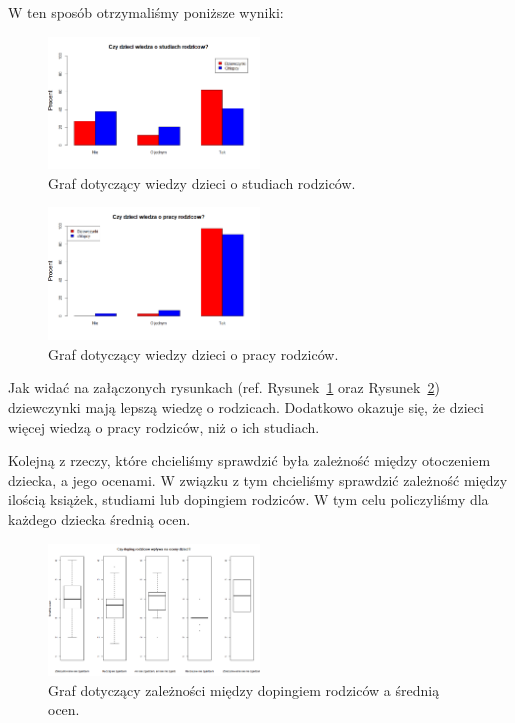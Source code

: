 \documentclass[conference]{IEEEtran}
\begin{document}
W ten sposób otrzymaliśmy poniższe wyniki:

\begin{figure}
	\centering
	\includegraphics[width=0.5\textwidth]{1.png}
	\caption{Graf dotyczący wiedzy dzieci o studiach rodziców.}
	\label{fig:studies_knowledge}
\end{figure}
\begin{figure}
	\centering
	\includegraphics[width=0.5\textwidth]{2.png}
	\caption{Graf dotyczący wiedzy dzieci o pracy rodziców.}
	\label{fig:work_knowledge}
\end{figure}

Jak widać na załączonych rysunkach (ref. Rysunek~\ref{fig:studies_knowledge} oraz Rysunek~\ref{fig:work_knowledge}) dziewczynki mają lepszą wiedzę o rodzicach. Dodatkowo okazuje się, że dzieci więcej wiedzą o pracy rodziców, niż o ich studiach.

Kolejną z rzeczy, które chcieliśmy sprawdzić była zależność między otoczeniem dziecka, a jego ocenami. W związku z tym chcieliśmy sprawdzić zależność między ilością książek, studiami lub dopingiem rodziców. W tym celu policzyliśmy dla każdego dziecka średnią ocen.

\begin{figure}
	\centering
	\includegraphics[width=0.5\textwidth]{3.png}
	\caption{Graf dotyczący zależności między dopingiem rodziców a  średnią ocen.}
	\label{fig:doping_oceny}
\end{figure}
\end{document}
